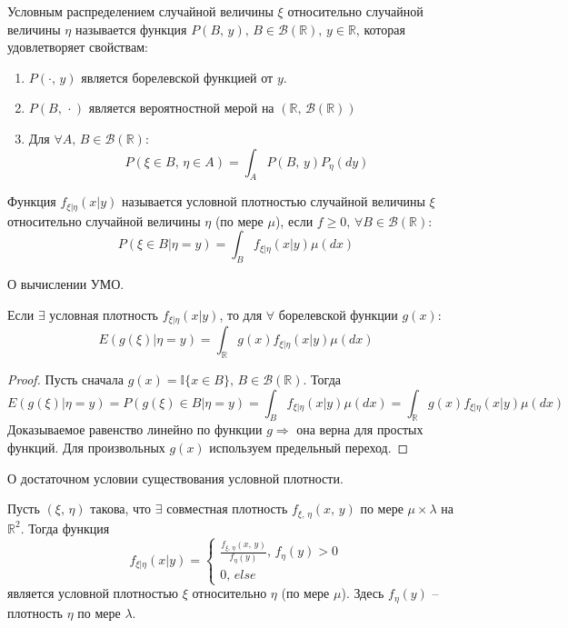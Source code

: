 \begin{definition}
	Условным распределением случайной величины $\xi$ относительно случайной величины $\eta$ называется функция $P(B,\, y),\, B \in \mathcal{B}(\mathbb{R}),\, y \in \mathbb{R}$, которая удовлетворяет свойствам:
	\begin{enumerate}
		\item $P(\cdot,\, y)$ является борелевской функцией от $y$.
		\item $P(B,\, \cdot)$ является вероятностной мерой на $(\mathbb{R},\, \mathcal{B}(\mathbb{R}))$
		\item Для $\forall A,\, B \in \mathcal{B}(\mathbb{R})$:
		      \[P(\xi \in B,\, \eta \in A) = \int_AP(B,\,y)P_\eta(dy)\]
	\end{enumerate}
\end{definition}

\begin{definition}
	Функция $f_{\xi | \eta}(x | y)$ называется условной плотностью случайной величины $\xi$ относительно случайной величины $\eta$ (по мере $\mu$), если $f \geq 0,\, \forall B \in \mathcal{B}(\mathbb{R})$:
	\[P(\xi \in B | \eta = y) = \int_B f_{\xi | \eta}(x | y)\mu(dx)\]
\end{definition}

\begin{theorem}
	О вычислении УМО.

	Если $\exists$ условная плотность $f_{\xi | \eta}(x | y)$, то для $\forall$ борелевской функции $g(x)$:
	\[E(g(\xi) | \eta = y) = \int_\mathbb{R}g(x)f_{\xi | \eta}(x | y)\mu(dx)\]
\end{theorem}

\begin{proof}
	Пусть сначала $g(x) = \mathbb{I}\{x \in B\},\, B \in \mathcal{B}(\mathbb{R})$. Тогда
	\[E(g(\xi) | \eta = y) = P(g(\xi) \in B | \eta = y) = \int_B f_{\xi | \eta}(x | y)\mu(dx) = \int_\mathbb{R} g(x)f_{\xi | \eta}(x | y) \mu(dx)\]
	Доказываемое равенство линейно по функции $g \Rightarrow$ она верна для простых функций. Для произвольных $g(x)$ используем предельный переход.
\end{proof}

\begin{theorem}
	О достаточном условии существования условной плотности.

	Пусть $(\xi,\, \eta)$ такова, что $\exists$ совместная плотность $f_{\xi,\, \eta}(x,\, y)$ по мере $\mu \times \lambda$ на $\mathbb{R}^2$. Тогда функция
	\[
		f_{\xi | \eta}(x | y) =
		\begin{cases}
			\frac{f_{\xi,\, \eta}(x,\,y)}{f_\eta(y)},\, f_\eta(y) > 0 \\
			0,\, else
		\end{cases}
	\]
	является условной плотностью $\xi$ относительно $\eta$ (по мере $\mu$). Здесь $f_\eta(y)$ -- плотность $\eta$ по мере $\lambda$.
\end{theorem}

